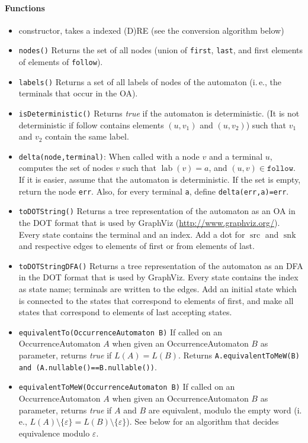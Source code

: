 \documentclass[a4paper,11pt, svgnames,titlepage]{article}
\newcommand{\emptyword}{\varepsilon}
\DeclareMathOperator{\lab}{lab}
\DeclareMathOperator{\src}{src}
\DeclareMathOperator{\snk}{snk}
\begin{document}
\paragraph{Functions}
\begin{itemize}
	\item constructor, takes a indexed (D)RE (see the conversion algorithm below)
	\item\texttt{nodes()} Returns the set of all nodes (union of \texttt{first}, \texttt{last}, and first elements of elements of \texttt{follow}). 
	\item\texttt{labels()} Returns a set of all labels of nodes of the automaton (i.\,e., the terminals that occur in the OA).
	\item\texttt{isDeterministic()} Returns \emph{true} if the automaton is deterministic. (It is not deterministic if follow contains elements $(u,v_1)$ and $(u,v_2)$) such that $v_1$ and $v_2$ contain the same label. 
	\item\texttt{delta(node,terminal)}: When called with a node $v$ and a terminal $u$, computes the set of nodes $v$ such that $\lab(v)=a$, and $(u,v)\in\mathtt{follow}$. If it is easier, assume that the automaton is deterministic. If the set is empty, return the node \texttt{err}. Also, for every terminal \texttt{a}, define \texttt{delta(err,a)=err}.
	\item\texttt{toDOTString()} Returns a tree representation of the automaton as an OA in the DOT format that is used by GraphViz  (\url{http://www.graphviz.org/}). Every state contains the terminal and an index. Add a dot for $\src$ and $\snk$ and respective edges to elements of first or from elements of last.
	\item\texttt{toDOTStringDFA()} Returns a tree representation of the automaton as an DFA in the DOT format that is used by GraphViz. Every state contains the index as state name; terminals are written to the edges. Add an initial state which is connected to the states that correspond to elements of first, and make all states that correspond to elements of last accepting states.
	\item\texttt{equivalentTo(OccurrenceAutomaton B)} If called on an OccurrenceAutomaton $A$ when given an OccurrenceAutomaton $B$ as parameter, returns \emph{true} if $L(A)=L(B)$. Returns \texttt{A.equivalentToMeW(B) and (A.nullable()==B.nullable())}.
	\item\texttt{equivalentToMeW(OccurrenceAutomaton B)} If called on an OccurrenceAutomaton $A$ when given an OccurrenceAutomaton $B$ as parameter, returns \emph{true} if $A$ and $B$ are equivalent, modulo the empty word (i.\,e., $L(A)\setminus\{\emptyword\}=L(B)\setminus\{\emptyword\}$). See below for an algorithm that decides equivalence modulo $\emptyword$.
\end{itemize}
\end{document}
